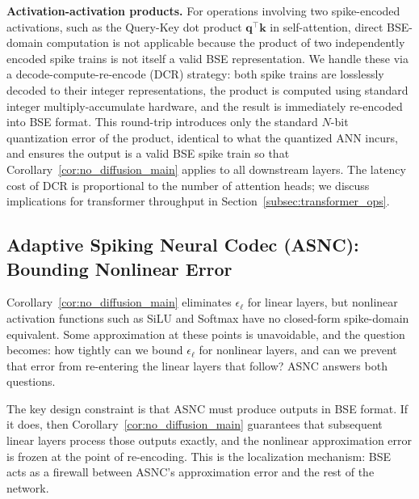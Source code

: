 \documentclass{article}
\theoremstyle{plain}
\theoremstyle{definition}
\theoremstyle{remark}
\begin{document}
\noindent\textbf{Activation-activation products.}
For operations involving two spike-encoded activations, such as the Query-Key dot
product $\mathbf{q}^\top\mathbf{k}$ in self-attention, direct BSE-domain computation
is not applicable because the product of two independently encoded spike trains is
not itself a valid BSE representation. We handle these via a decode-compute-re-encode
(DCR) strategy: both spike trains are losslessly decoded to their integer
representations, the product is computed using standard integer multiply-accumulate
hardware, and the result is immediately re-encoded into BSE format. This round-trip
introduces only the standard $N$-bit quantization error of the product, identical to
what the quantized ANN incurs, and ensures the output is a valid BSE spike train so
that Corollary~\ref{cor:no_diffusion_main} applies to all downstream layers. The
latency cost of DCR is proportional to the number of attention heads; we discuss
implications for transformer throughput in Section~\ref{subsec:transformer_ops}.

\subsection{Adaptive Spiking Neural Codec (ASNC): Bounding Nonlinear Error}
\label{subsec:asnc}

Corollary~\ref{cor:no_diffusion_main} eliminates $\epsilon_\ell$ for linear layers,
but nonlinear activation functions such as SiLU and Softmax have no closed-form
spike-domain equivalent. Some approximation at these points is unavoidable, and the
question becomes: how tightly can we bound $\epsilon_\ell$ for nonlinear layers, and
can we prevent that error from re-entering the linear layers that follow? ASNC answers
both questions.

The key design constraint is that ASNC must produce outputs in BSE format. If it
does, then Corollary~\ref{cor:no_diffusion_main} guarantees that subsequent linear
layers process those outputs exactly, and the nonlinear approximation error is frozen
at the point of re-encoding. This is the localization mechanism: BSE acts as a
firewall between ASNC's approximation error and the rest of the network.
\end{document}
